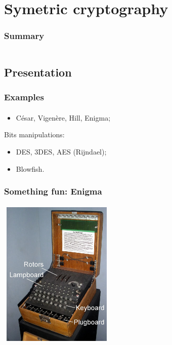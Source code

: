 \documentclass[]{beamer}
\begin{document}
%
%
\section{Symetric cryptography}
\begin{frame}
    \frametitle{Summary}
    \begin{columns}[t]
        \begin{column}{5cm}
            \tableofcontents[sections={1-3}, currentsection, hideothersubsections]
        \end{column}
        \begin{column}{5cm}
            \tableofcontents[sections={4-5}, currentsection, hideothersubsections]
        \end{column}
    \end{columns}
\end{frame}
\subsection{Presentation}
\begin{frame}
\frametitle{Examples}
\framesubtitle{}
\begin{itemize}
    \item César, Vigenère, Hill, Enigma;
\end{itemize}
Bits manipulations:
\begin{itemize}
    \item DES, 3DES, AES (Rijndael);
    \item Blowfish.
\end{itemize}

\end{frame}


\begin{frame}
\frametitle{Something fun: Enigma}
\framesubtitle{}
\begin{center}
\includegraphics[height=7.0cm, width=5.5cm]{./images/Enigma_machine.png}
\end{center}
\end{frame}
\end{document}
